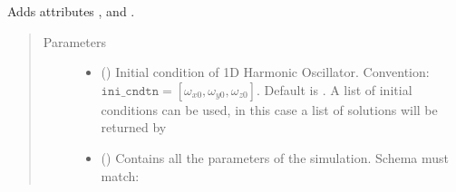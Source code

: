 \documentclass[a4paper,landscape,10pt,english]{sphinxmanual}
\begin{document}
\begin{fulllineitems}
\begin{fulllineitems}
Adds attributes
{\hyperref[\detokenize{code_docs/simulation_API.simulation:simulation_API.simulation.simulations.ChenLeeAttractor.a}]{}},
{\hyperref[\detokenize{code_docs/simulation_API.simulation:simulation_API.simulation.simulations.ChenLeeAttractor.b}]{}} and
{\hyperref[\detokenize{code_docs/simulation_API.simulation:simulation_API.simulation.simulations.ChenLeeAttractor.c}]{}}.
\begin{quote}\begin{description}
\item[{Parameters}] \leavevmode\begin{itemize}
\item {} 
 (\sphinxstyleliteralemphasis{\sphinxupquote{, }}\sphinxstyleliteralemphasis{\sphinxupquote{ (}}\sphinxstyleliteralemphasis{\sphinxupquote{,}}\sphinxstyleliteralemphasis{\sphinxupquote{)}}) \textendash{} Initial condition of 1D Harmonic Oscillator. Convention:
\(\texttt{ini_cndtn} = [\omega_{x0}, \omega_{y0}, \omega_{z0}]\).
Default is \sphinxcode{\sphinxupquote{{[}10, 10, 0{]}}}. A list of initial conditions can be
used, in this case a list of solutions will be returned by
{\hyperref[\detokenize{code_docs/simulation_API.simulation:simulation_API.simulation.simulations.Simulation.simulate}]{}}

\item {} 
 (\sphinxstyleliteralemphasis{\sphinxupquote{, }}) \textendash{} 
Contains all the parameters of the simulation. Schema must match:

\begin{sphinxVerbatim}[commandchars=\\\{\}]
          
          
          
\end{sphinxVerbatim}


\end{itemize}
\end{description}
\end{quote}
\end{fulllineitems}
\end{fulllineitems}
\end{document}
